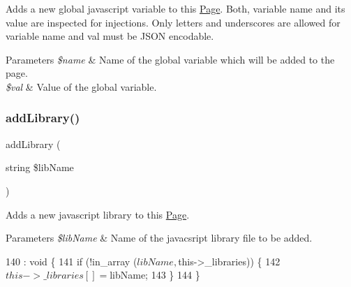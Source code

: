 Adds a new global javascript variable to this \hyperlink{class_lora_1_1_page}{Page}. Both, variable name and its value are inspected for injections. Only letters and underscores are allowed for variable name and val must be J\+S\+ON encodable. 
\begin{DoxyParams}{Parameters}
{\em \$name} & Name of the global variable which will be added to the page. \\
\hline
{\em \$val} & Value of the global variable. \\
\hline
\end{DoxyParams}

\mbox{\label{class_lora_1_1_page_a0142622c98f897c6345547516325c876}} 
\subsubsection{\texorpdfstring{add\+Library()}{addLibrary()}}
{\footnotesize\ttfamily add\+Library (\begin{DoxyParamCaption}\item[{string}]{\$lib\+Name }\end{DoxyParamCaption})}

Adds a new javascript library to this \hyperlink{class_lora_1_1_page}{Page}. 
\begin{DoxyParams}{Parameters}
{\em \$lib\+Name} & Name of the javacsript library file to be added. \\
\hline
\end{DoxyParams}

\begin{DoxyCode}
140                                                  : \textcolor{keywordtype}{void} \{
141         \textcolor{keywordflow}{if} (!in\_array ($libName, $this->\_libraries)) \{
142             $this->\_libraries [] = $libName;
143         \}
144     \}
\end{DoxyCode}
\mbox{\label{class_lora_1_1_page_a7fe61d61fcc6f2fd15c5ac37d43299c8}} 
